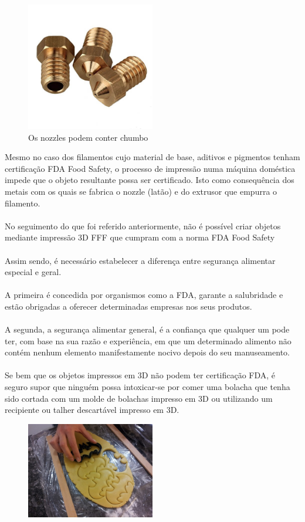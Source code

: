 \documentclass[11pt,a4paper]{article}
\begin{document}
\begin{figure}[H]
\centering
\includegraphics[width=0.5\textwidth,cfbox=azul_marcos 1pt 0pt]{FOTOS/NOZZLES}
\caption*{Os nozzles podem conter chumbo}
\end{figure}
Mesmo no caso dos filamentos cujo material de base, aditivos e pigmentos tenham certificação FDA Food Safety, o processo de impressão numa máquina doméstica impede que o objeto resultante possa ser certificado. Isto como consequência dos metais com os quais se fabrica o nozzle (latão) e do extrusor que empurra o filamento.
\\\\
No seguimento do que foi referido anteriormente, não é possível criar objetos mediante impressão 3D FFF que cumpram com a norma FDA Food Safety
\\\\
Assim sendo, é necessário estabelecer a diferença entre segurança alimentar especial e geral.
\\\\
A primeira é concedida por organismos como a FDA, garante a salubridade e estão obrigadas a oferecer determinadas empresas nos seus produtos.
\\\\
A segunda, a segurança alimentar general, é a confiança que qualquer um pode ter, com base na sua razão e experiência, em que um determinado alimento não contém nenhum elemento manifestamente nocivo depois do seu manuseamento.
\\\\
Se bem que os objetos impressos em 3D não podem ter certificação FDA, é seguro supor que ninguém possa intoxicar-se por comer uma bolacha que tenha sido cortada com um molde de bolachas impresso em 3D ou utilizando um recipiente ou talher descartável impresso em 3D.
\begin{figure}[H]
\centering
\includegraphics[width=0.5\textwidth,cfbox=azul_marcos 1pt 0pt]{FOTOS/CORTADORGALLETAS}
\end{figure}
\end{document}
